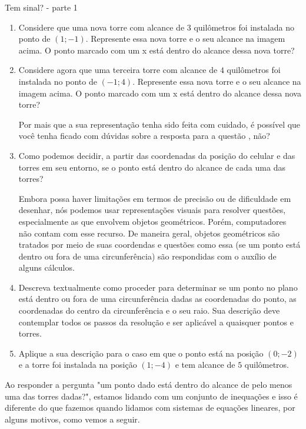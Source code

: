 \clearpage

\begin{task}{Tem sinal? - parte 1}
\begin{enumerate}
\item Considere que uma nova torre com alcance de $3$ quilômetros foi instalada no ponto de $(1;-1)$. Represente essa nova torre e o seu alcance na imagem acima. O ponto marcado com um x está dentro do alcance dessa nova torre?

\item Considere agora que uma terceira torre com alcance de $4$ quilômetros foi instalada no ponto de $(-1;4)$. Represente essa nova torre e o seu alcance na imagem acima. O ponto marcado com um x está dentro do alcance dessa nova torre?

Por mais que a sua representação tenha sido feita com cuidado, é possível que você tenha ficado com dúvidas sobre a resposta para a questão , não?

\item Como podemos decidir, a partir das coordenadas da posição do celular e das torres em seu entorno, se o ponto está dentro do alcance de cada uma das torres?

Embora possa haver limitações em termos de precisão ou de dificuldade em desenhar, nós podemos usar representações visuais para resolver questões, especialmente as que envolvem objetos geométricos. Porém, computadores não contam com esse recurso. De maneira geral, objetos geométricos são tratados por meio de suas coordendas e questões como essa (se um ponto está dentro ou fora de uma circunferência) são respondidas com o auxílio de alguns cálculos.

\item Descreva textualmente como proceder para determinar se um ponto no plano está dentro ou fora de uma circunferência dadas as coordenadas do ponto, as coordenadas do centro da circunferência e o seu raio. Sua descrição deve contemplar todos os passos da resolução e ser aplicável a quaisquer pontos e torres.

\item Aplique a sua descrição para o caso em que o ponto está na posição $(0;-2)$ e a torre foi instalada na posição $(1;-4)$ e tem alcance de $5$ quilômetros.
\end{enumerate}
\end{task}

\label{comp-arr10}

Ao responder a pergunta "um ponto dado está dentro do alcance de pelo menos uma das  torres dadas?", estamos lidando com um conjunto de  inequações e isso é diferente do que fazemos quando lidamos com sistemas de equações lineares, por alguns motivos, como vemos a seguir.

